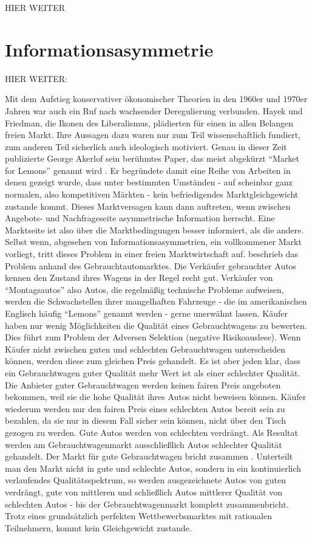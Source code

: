 HIER WEITER


\section{Informationsasymmetrie}
\label{Info}

HIER WEITER:
\parencite{Sandmo1999}


Mit dem Aufstieg konservativer ökonomischer Theorien in den 1960er und 1970er Jahren war auch ein Ruf nach wachsender Deregulierung verbunden. Hayek und Friedman, die Ikonen des Liberalismus, plädierten für einen in allen Belangen freien Markt. Ihre Aussagen dazu waren nur zum Teil wissenschaftlich fundiert, zum anderen Teil sicherlich auch ideologisch motiviert. Genau in dieser Zeit publizierte George Akerlof sein berühmtes Paper, das meist abgekürzt "`Market for Lemons"' genannt wird \parencite{Akerlof1970}. Er begründete damit eine Reihe von Arbeiten in denen gezeigt wurde, dass unter bestimmten Umständen - auf scheinbar ganz normalen, also kompetitiven Märkten - kein befriedigendes Marktgleichgewicht zustande kommt. Dieses Marktversagen kann dann auftreten, wenn zwischen Angebots- und Nachfrageseite asymmetrische Information herrscht. Eine Marktseite ist also über die Marktbedingungen besser informiert, als die andere. Selbst wenn, abgesehen von Informationsasymmetrien, ein vollkommener Markt vorliegt, tritt dieses Problem in einer freien Marktwirtschaft auf. \textcite{Akerlof1970} beschrieb das Problem anhand des Gebrauchtautomarktes. Die Verkäufer gebrauchter Autos kennen den Zustand ihres Wagens in der Regel recht gut. Verkäufer von "`Montagsautos"'  also Autos, die regelmäßig technische Probleme aufweisen, werden die Schwachstellen ihrer mangelhaften Fahrzeuge - die im amerikanischen Englisch häufig "`Lemons"' genannt werden - gerne unerwähnt lassen. Käufer haben nur wenig Möglichkeiten die Qualität eines Gebrauchtwagens zu bewerten. Dies führt zum Problem der Adversen Selektion (negative Risikoauslese). Wenn Käufer nicht zwischen guten und schlechten Gebrauchtwagen unterscheiden können, werden diese zum gleichen Preis gehandelt. Es ist aber jeden klar, dass ein Gebrauchtwagen guter Qualität mehr Wert ist als einer schlechter Qualität. Die Anbieter guter Gebrauchtwagen werden keinen fairen Preis angeboten bekommen, weil sie die hohe Qualität ihres Autos nicht beweisen können. Käufer wiederum werden nur den fairen Preis eines schlechten Autos bereit sein zu bezahlen, da sie nur in diesem Fall sicher sein können, nicht über den Tisch gezogen zu werden. Gute Autos werden von schlechten verdrängt. Als Resultat werden am Gebrauchtwagenmarkt ausschließlich Autos schlechter Qualität gehandelt. Der Markt für gute Gebrauchtwagen bricht zusammen \parencite[S. 490]{Akerlof1970}. Unterteilt man den Markt nicht in gute und schlechte Autos, sondern in ein kontinuierlich verlaufendes Qualitätsspektrum, so werden  ausgezeichnete Autos von guten verdrängt, gute von mittleren und schließlich Autos mittlerer Qualität von schlechten Autos - bis der Gebrauchtwagenmarkt komplett zusammenbricht. Trotz eines grundsätzlich perfekten Wettbewerbsmarktes mit rationalen Teilnehmern, kommt kein Gleichgewicht zustande.

